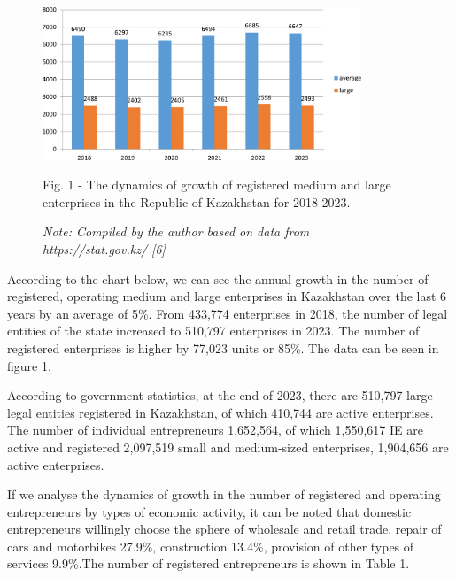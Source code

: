 \begin{figure}[H]
	\centering
	\includegraphics[width=0.85\textwidth]{media/ekon/Graph_1}
	\caption*{Fig. 1 - The dynamics of growth of registered medium and large enterprises in the Republic of Kazakhstan for 2018-2023.}
	\caption*{\normalfont \emph{Note: Compiled by the author based on data from https://stat.gov.kz/ {[}6{]}}}
\end{figure}

\begin{multicols}{2}
According to the chart below, we can see the annual growth in the number
of registered, operating medium and large enterprises in Kazakhstan over
the last 6 years by an average of 5\%. From 433,774 enterprises in 2018,
the number of legal entities of the state increased to 510,797
enterprises in 2023. The number of registered enterprises is higher by
77,023 units or 85\%. The data can be seen in figure 1.

According to government statistics, at the end of 2023, there are
510,797 large legal entities registered in Kazakhstan, of which 410,744
are active enterprises. The number of individual entrepreneurs
1,652,564, of which 1,550,617 IE are active and registered 2,097,519
small and medium-sized enterprises, 1,904,656 are active enterprises.

If we analyse the dynamics of growth in the number of registered and
operating entrepreneurs by types of economic activity, it can be noted
that domestic entrepreneurs willingly choose the sphere of wholesale and
retail trade, repair of cars and motorbikes 27.9\%, construction 13.4\%,
provision of other types of services 9.9\%.The number of registered
entrepreneurs is shown in Table 1.
\end{multicols}
\endgroup

